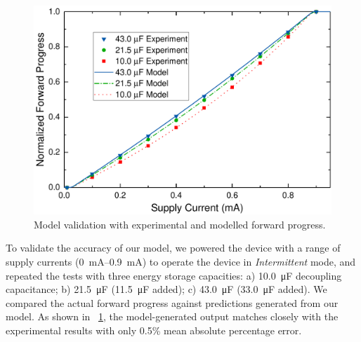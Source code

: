 

\begin{figure}
	\centering
	\includegraphics[width=0.8\columnwidth]{ch3_sizingeffect/figures/ModelValidFig} %
	\caption{Model validation with experimental and modelled forward progress. }
	\label{fig:modelvalid}
\end{figure}

To validate the accuracy of our model, we powered the device with a range of supply currents (\SIrange{0}{0.9}{\milli\ampere}) to operate the device in \textit{Intermittent} mode, and repeated the tests with three energy storage capacities: a) \SI{10.0}{\micro\farad} decoupling capacitance; b) \SI{21.5}{\micro\farad} (\SI{11.5}{\micro\farad} added); c) \SI{43.0}{\micro\farad} (\SI{33.0}{\micro\farad} added). We compared the actual forward progress against predictions generated from our model. As shown in \figurename{~\ref{fig:modelvalid}}, the model-generated output matches closely with the experimental results with only 0.5\% mean absolute percentage error. 

